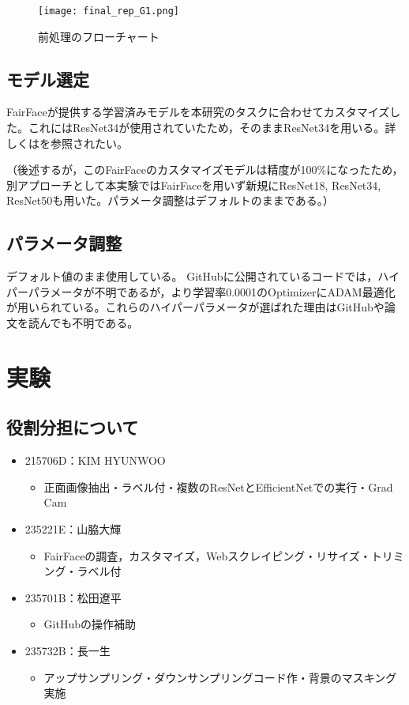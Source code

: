 \documentclass[a4paper,11pt,titlepage]{jsarticle}
\begin{document}
\begin{figure}[H]
    \centering
    \texttt{[image: final\_rep\_G1.png]}
    \caption{前処理のフローチャート}
    \label{fig:csv}
\end{figure}


\subsection{モデル選定}
FairFaceが提供する学習済みモデルを本研究のタスクに合わせてカスタマイズした。これにはResNet34が使用されていたため，そのままResNet34を用いる。詳しくは\cite{karkkainenFairFace}を参照されたい。\par
（後述するが，このFairFaceのカスタマイズモデルは精度が100\%になったため，別アプローチとして本実験ではFairFaceを用いず新規にResNet18, ResNet34, ResNet50も用いた。パラメータ調整はデフォルトのままである。）



\subsection{パラメータ調整}
デフォルト値のまま使用している。
GitHubに公開されているコードでは，ハイパーパラメータが不明であるが，\cite{karkkainenFairFace}より学習率0.0001のOptimizerにADAM最適化が用いられている。これらのハイパーパラメータが選ばれた理由はGitHubや論文を読んでも不明である。

\section{実験}

\subsection{役割分担について}
\begin{itemize}
    \item 215706D：KIM HYUNWOO
        \begin{itemize}
            \item 正面画像抽出・ラベル付・複数のResNetとEfficientNetでの実行・Grad Cam
        \end{itemize}
    \item 235221E：山脇大輝
        \begin{itemize}
            \item FairFaceの調査，カスタマイズ，Webスクレイピング・リサイズ・トリミング・ラベル付
        \end{itemize}
    \item 235701B：松田遼平
        \begin{itemize}
            \item GitHubの操作補助
        \end{itemize}
    \item 235732B：長一生
        \begin{itemize}
            \item アップサンプリング・ダウンサンプリングコード作・背景のマスキング実施
        \end{itemize}
\end{itemize}
\end{document}

